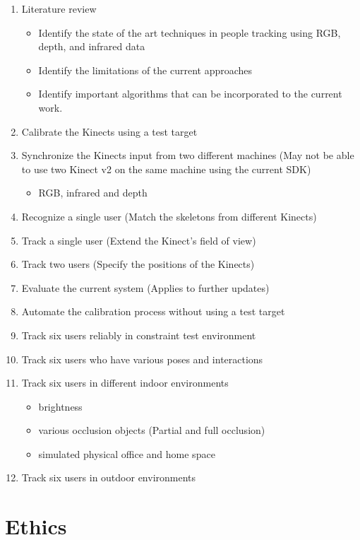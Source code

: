 \documentclass[paper=a4, fontsize=11pt]{scrartcl}
\numberwithin{equation}{section}
\numberwithin{figure}{section}
\numberwithin{table}{section}
\begin{document}
\begin{enumerate}
\item Literature review
	\begin{itemize}
		\item Identify the state of the art techniques in people tracking using RGB, depth, and infrared data
		\item Identify the limitations of the current approaches
		\item Identify important algorithms that can be incorporated to the current work.
	\end{itemize}
\item Calibrate the Kinects using a test target
\item Synchronize the Kinects input from two different machines (May not be able to use two Kinect v2 on the same machine using the current SDK)
	\begin{itemize}
		\item RGB, infrared and depth
	\end{itemize}
\item Recognize a single user (Match the skeletons from different Kinects)
\item Track a single user (Extend the Kinect's field of view)
\item Track two users (Specify the positions of the Kinects)
\item Evaluate the current system (Applies to further updates)
\item Automate the calibration process without using a test target
\item Track six users reliably in constraint test environment
\item Track six users who have various poses and interactions
\item Track six users in different indoor environments
	\begin{itemize}
		\item brightness
		\item various occlusion objects (Partial and full occlusion)
		\item simulated physical office and home space
	\end{itemize}
\item Track six users in outdoor environments
\end{enumerate}

\section{Ethics}
\end{document}
